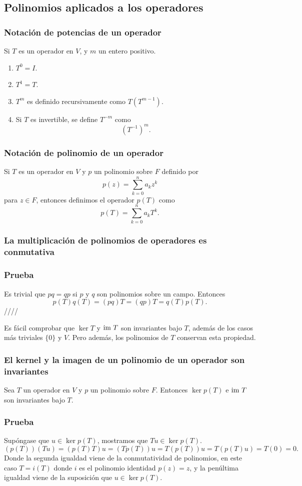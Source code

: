 \documentclass{article}
\begin{document}
\subsection{Polinomios aplicados a los operadores}
\subsubsection{Notación de potencias de un operador}
Si $T$ es un operador en $V$, y $m$ un entero positivo.
\begin{enumerate}
    \item $T^0= I$.
    \item $T^1 = T$.
    \item $T^m$ es definido recursivamente como $T(T^{m-1})$.
    \item Si $T$ es invertible, se define $T^{-m}$ como
    $$(T^{-1})^m.$$
\end{enumerate}

\subsubsection{Notación de polinomio de un operador}
Si $T$ es un operador en $V$ y $p$ un polinomio sobre $F$
definido por $$p(z)=\sum^n_{k=0}a_k z^k$$
para $z\in F$, entonces definimos el operador $p(T)$ como
$$p(T)=\sum^n_{k=0}a_k T^k.$$

\subsubsection{La multiplicación de polinomios de operadores es conmutativa}
\subsubsection*{Prueba}
Es trivial que $pq=qp$ si $p$ y $q$ son polinomios sobre un
campo. Entonces $$p(T)q(T) = (pq)T = (qp)T = q(T)p(T).$$
\hfill ////

Es fácil comprobar que $\ker T$ y $\text{im } T$ son invariantes bajo
$T$, además de los casos más triviales $\{0\}$ y $V$.
Pero además, los polinomios de $T$ conservan esta propiedad.
\newpage

\subsubsection{El kernel y la imagen de un polinomio de un operador son invariantes}
Sea $T$ un operador en $V$ y $p$ un polinomio sobre $F$. 
Entonces $\ker p(T)$ e $\text{im } T$ son invariantes bajo $T$.
\subsubsection*{Prueba}
Supóngase que $u\in\ker p(T)$, mostramos que $Tu\in\ker p(T)$.
$$(p(T))(Tu)=(p(T)T)u=(Tp(T))u=T(p(T))u=T(p(T)u)=T(0)=0.$$
Donde la segunda igualdad viene de la conmutatividad de
polinomios, en este caso $T=i(T)$ donde $i$ es el polinomio
identidad $p(z)=z$, y la penúltima igualdad viene de la
suposición que $u\in\ker p(T)$.
\end{document}
